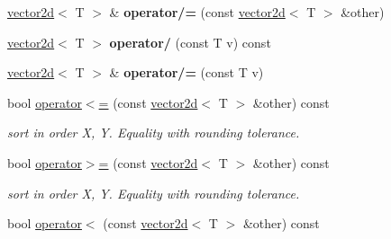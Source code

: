 \begin{DoxyCompactItemize}
\item 
\hyperlink{classirr_1_1core_1_1vector2d}{vector2d}$<$ T $>$ \& {\bfseries operator/=} (const \hyperlink{classirr_1_1core_1_1vector2d}{vector2d}$<$ T $>$ \&other)\hypertarget{classirr_1_1core_1_1vector2d_a2ee6a9455f42afd1f6208332557c7bf6}{}\label{classirr_1_1core_1_1vector2d_a2ee6a9455f42afd1f6208332557c7bf6}

\item 
\hyperlink{classirr_1_1core_1_1vector2d}{vector2d}$<$ T $>$ {\bfseries operator/} (const T v) const \hypertarget{classirr_1_1core_1_1vector2d_a343b682b0b27782efecfcc4bc2b62162}{}\label{classirr_1_1core_1_1vector2d_a343b682b0b27782efecfcc4bc2b62162}

\item 
\hyperlink{classirr_1_1core_1_1vector2d}{vector2d}$<$ T $>$ \& {\bfseries operator/=} (const T v)\hypertarget{classirr_1_1core_1_1vector2d_a0a5115fdbc8023793d11ddfea27dd124}{}\label{classirr_1_1core_1_1vector2d_a0a5115fdbc8023793d11ddfea27dd124}

\item 
bool \hyperlink{classirr_1_1core_1_1vector2d_a828609667abff67902f1de3c2718d9a9}{operator$<$=} (const \hyperlink{classirr_1_1core_1_1vector2d}{vector2d}$<$ T $>$ \&other) const \hypertarget{classirr_1_1core_1_1vector2d_a828609667abff67902f1de3c2718d9a9}{}\label{classirr_1_1core_1_1vector2d_a828609667abff67902f1de3c2718d9a9}

\begin{DoxyCompactList}\small\item\em sort in order X, Y. Equality with rounding tolerance. \end{DoxyCompactList}\item 
bool \hyperlink{classirr_1_1core_1_1vector2d_a09446a47463a9b09c55f87c4ffa19841}{operator$>$=} (const \hyperlink{classirr_1_1core_1_1vector2d}{vector2d}$<$ T $>$ \&other) const \hypertarget{classirr_1_1core_1_1vector2d_a09446a47463a9b09c55f87c4ffa19841}{}\label{classirr_1_1core_1_1vector2d_a09446a47463a9b09c55f87c4ffa19841}

\begin{DoxyCompactList}\small\item\em sort in order X, Y. Equality with rounding tolerance. \end{DoxyCompactList}\item 
bool \hyperlink{classirr_1_1core_1_1vector2d_ac777d6a0b25ed66e73d1b71f25fdbe48}{operator$<$} (const \hyperlink{classirr_1_1core_1_1vector2d}{vector2d}$<$ T $>$ \&other) const \hypertarget{classirr_1_1core_1_1vector2d_ac777d6a0b25ed66e73d1b71f25fdbe48}{}\label{classirr_1_1core_1_1vector2d_ac777d6a0b25ed66e73d1b71f25fdbe48}


\end{DoxyCompactItemize}
